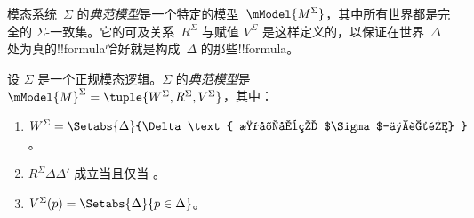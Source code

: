 \documentclass[../../../include/open-logic-section]{subfiles}
\begin{document}


模态系统~$\Sigma$ 的\emph{典范模型}是一个特定的模型~$\mModel{M^\Sigma}$，其中所有世界都是完全的 $\Sigma$-一致集。它的可及关系~$R^\Sigma$ 与赋值 $V^\Sigma$ 是这样定义的，以保证在世界~$\Delta$ 处为真的!!{formula}恰好就是构成~$\Delta$ 的那些!!{formula}。

\begin{defn}
  设 $\Sigma$ 是一个正规模态逻辑。$\Sigma$ 的\emph{典范模型}是 $\mModel{M}^\Sigma = \tuple{W^\Sigma, R^\Sigma, V^\Sigma}$，其中：
  \begin{enumerate}
  \item $W^\Sigma = \Setabs{ \Delta }{\Delta \text{
      是完全的 $\Sigma$-一致集} }$。
  \item $R^\Sigma \Delta\Delta'$ 成立当且仅当
    。
  \item $V^\Sigma(p) = \Setabs{\Delta}{p \in \Delta}$。
  \end{enumerate}
\end{defn}
\end{document}
